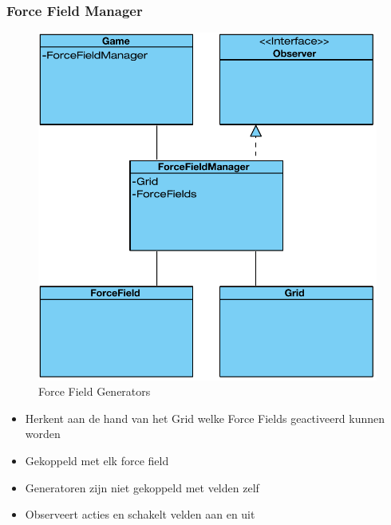 \documentclass[t]{beamer}
\begin{document}
\subsubsection{Force Field Manager}
\begin{frame}
\begin{multicols}{2}
\begin{figure}
	\center
	\includegraphics[width= 0.9\linewidth]{img/forcefieldmanager.pdf}
	\caption{Force Field Generators}
\end{figure}

\begin{itemize}
	\item Herkent aan de hand van het Grid welke Force Fields geactiveerd kunnen worden
	\item Gekoppeld met elk force field
	\item Generatoren zijn niet gekoppeld met velden zelf
	\item Observeert acties en schakelt velden aan en uit
\end{itemize}
\end{multicols}
\end{frame}
\end{document}
